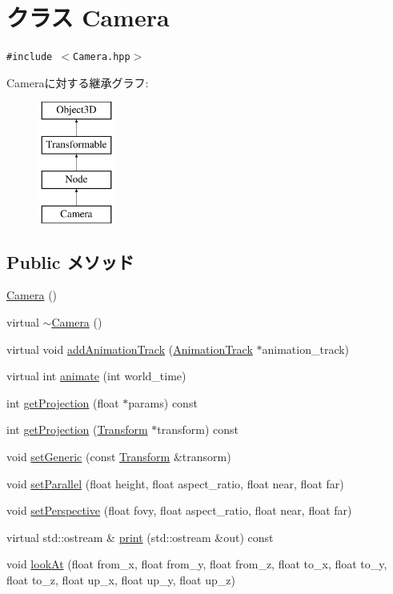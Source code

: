 \hypertarget{classm3g_1_1Camera}{
\section{クラス Camera}
\label{classm3g_1_1Camera}
}
{\tt \#include $<$Camera.hpp$>$}

Cameraに対する継承グラフ:\begin{figure}[H]
\begin{center}
\leavevmode
\includegraphics[height=4cm]{classm3g_1_1Camera}
\end{center}
\end{figure}
\subsection*{Public メソッド}
\begin{CompactItemize}
\item 
\hyperlink{classm3g_1_1Camera_a3f3efcb2fcc75de885df29041103cd2}{Camera} ()
\item 
virtual \hyperlink{classm3g_1_1Camera_b921e886e6f14e117eb8099ccb0a3775}{$\sim$Camera} ()
\item 
virtual void \hyperlink{classm3g_1_1Camera_415c0b110f95410ded9b85e5d99a496b}{addAnimationTrack} (\hyperlink{classm3g_1_1AnimationTrack}{AnimationTrack} $\ast$animation\_\-track)
\item 
virtual int \hyperlink{classm3g_1_1Camera_8aad1ceab4c2a03609c8a42324ce484d}{animate} (int world\_\-time)
\item 
int \hyperlink{classm3g_1_1Camera_a2ebe46a4e16fee86d4f547588411302}{getProjection} (float $\ast$params) const 
\item 
int \hyperlink{classm3g_1_1Camera_9e0c204df146342990703acb744954b1}{getProjection} (\hyperlink{classm3g_1_1Transform}{Transform} $\ast$transform) const 
\item 
void \hyperlink{classm3g_1_1Camera_51c42821097e90d3f59e87676684f60a}{setGeneric} (const \hyperlink{classm3g_1_1Transform}{Transform} \&transorm)
\item 
void \hyperlink{classm3g_1_1Camera_cb4535fd75b28b4d58390962d0c0e588}{setParallel} (float height, float aspect\_\-ratio, float near, float far)
\item 
void \hyperlink{classm3g_1_1Camera_ca92a48ebe3424deac8e54c27550189d}{setPerspective} (float fovy, float aspect\_\-ratio, float near, float far)
\item 
virtual std::ostream \& \hyperlink{classm3g_1_1Camera_6fea17fa1532df3794f8cb39cb4f911f}{print} (std::ostream \&out) const 
\item 
void \hyperlink{classm3g_1_1Camera_0006b18ae0e27a031d533e987b9756a8}{lookAt} (float from\_\-x, float from\_\-y, float from\_\-z, float to\_\-x, float to\_\-y, float to\_\-z, float up\_\-x, float up\_\-y, float up\_\-z)
\end{CompactItemize}

